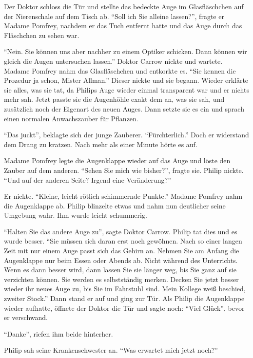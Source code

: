 Der Doktor schloss die Tür und stellte das bedeckte Auge im Glasfläschchen auf der Nierenschale auf dem Tisch ab. \enquote{Soll ich Sie alleine lassen?}, fragte er Madame Pomfrey, nachdem er das Tuch entfernt hatte und das Auge durch das Fläschchen zu sehen war.

\enquote{Nein. Sie können uns aber nachher zu einem Optiker schicken. Dann können wir gleich die Augen untersuchen lassen.} Doktor Carrow nickte und wartete. Madame Pomfrey nahm das Glasfläschchen und entkorkte es. \enquote{Sie kennen die Prozedur ja schon, Mister Allman.} Dieser nickte und sie begann. Wieder erklärte sie alles, was sie tat, da Philips Auge wieder einmal transparent war und er nichts mehr sah. Jetzt passte sie die Augenhöhle exakt dem an, was sie sah, und zusätzlich noch der Eigenart des neuen Auges. Dann setzte sie es ein und sprach einen normalen Anwachszauber für Pflanzen.

\enquote{Das juckt}, beklagte sich der junge Zauberer. \enquote{Fürchterlich.} Doch er widerstand dem Drang zu kratzen. Nach mehr als einer Minute hörte es auf.

Madame Pomfrey legte die Augenklappe wieder auf das Auge und löste den Zauber auf dem anderen. \enquote{Sehen Sie mich wie bisher?}, fragte sie. Philip nickte. \enquote{Und auf der anderen Seite? Irgend eine Veränderung?}

Er nickte. \enquote{Kleine, leicht rötlich schimmernde Punkte.} Madame Pomfrey nahm die Augenklappe ab. Philip blinzelte etwas und nahm nun deutlicher seine Umgebung wahr. Ihm wurde leicht schummerig.

\enquote{Halten Sie das andere Auge zu}, sagte Doktor Carrow. Philip tat dies und es wurde besser. \enquote{Sie müssen sich daran erst noch gewöhnen. Nach so einer langen Zeit mit nur einem Auge passt sich das Gehirn an. Nehmen Sie am Anfang die Augenklappe nur beim Essen oder Abends ab. Nicht während des Unterrichts. Wenn es dann besser wird, dann lassen Sie sie länger weg, bis Sie ganz auf sie verzichten können. Sie werden es selbstständig merken. \gst Decken Sie jetzt besser wieder ihr neues Auge zu, bis Sie im Fahrstuhl sind. Mein Kollege weiß beschied, zweiter Stock.} Dann stand er auf und ging zur Tür. Als Philip die Augenklappe wieder aufhatte, öffnete der Doktor die Tür und sagte noch: \enquote{Viel Glück}, bevor er verschwand.

\enquote{Danke}, riefen ihm beide hinterher.

Philip sah seine Krankenschwester an. \enquote{Was erwartet mich jetzt noch?}

